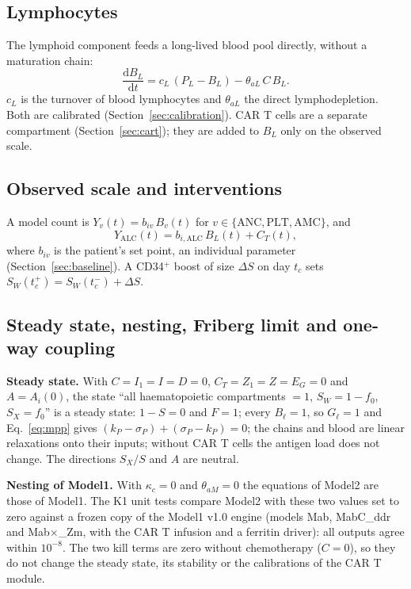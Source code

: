 \documentclass[11pt]{article}
\newcommand{\dd}{\mathrm{d}}
\begin{document}
\subsection{Lymphocytes}
The lymphoid component feeds a long-lived blood pool directly, without a maturation chain:
\begin{equation}
\frac{\dd B_L}{\dd t} = c_L\,(P_L-B_L) - \theta_{aL}\,C\,B_L. \label{eq:bl}
\end{equation}
$c_L$ is the turnover of blood lymphocytes and $\theta_{aL}$ the direct lymphodepletion. Both are calibrated (Section~\ref{sec:calibration}). CAR T cells are a separate compartment (Section~\ref{sec:cart}); they are added to $B_L$ only on the observed scale.

\subsection{Observed scale and interventions}
A model count is $Y_v(t)=b_{iv}\,B_v(t)$ for $v\in\{\mathrm{ANC},\mathrm{PLT},\mathrm{AMC}\}$, and
\begin{equation}
Y_{\mathrm{ALC}}(t)=b_{i,\mathrm{ALC}}\,B_L(t)+C_T(t), \label{eq:alc}
\end{equation}
where $b_{iv}$ is the patient's set point, an individual parameter (Section~\ref{sec:baseline}). A CD34$^+$ boost of size $\Delta S$ on day $t_c$ sets $S_W(t_c^+)=S_W(t_c^-)+\Delta S$.

\subsection{Steady state, nesting, Friberg limit and one-way coupling}\label{sec:steady}
\textbf{Steady state.} With $C=I_1=I=D=0$, $C_T=Z_1=Z=E_G=0$ and $A=A_i(0)$, the state ``all haematopoietic compartments $=1$, $S_W=1-f_0$, $S_X=f_0$'' is a steady state: $1-S=0$ and $F=1$; every $B_\ell=1$, so $G_\ell=1$ and Eq.~\ref{eq:mpp} gives $(k_P-\sigma_P)+(\sigma_P-k_P)=0$; the chains and blood are linear relaxations onto their inputs; without CAR T cells the antigen load does not change. The directions $S_X/S$ and $A$ are neutral.

\textbf{Nesting of Model1.} With $\kappa_c=0$ and $\theta_{aM}=0$ the equations of Model2 are those of Model1. The K1 unit tests compare Model2 with these two values set to zero against a frozen copy of the Model1 v1.0 engine (models Mab, MabC\_ddr and Mab$\times$\_Zm, with the CAR T infusion and a ferritin driver): all outputs agree within $10^{-8}$. The two kill terms are zero without chemotherapy ($C=0$), so they do not change the steady state, its stability or the calibrations of the CAR T module.
\end{document}
